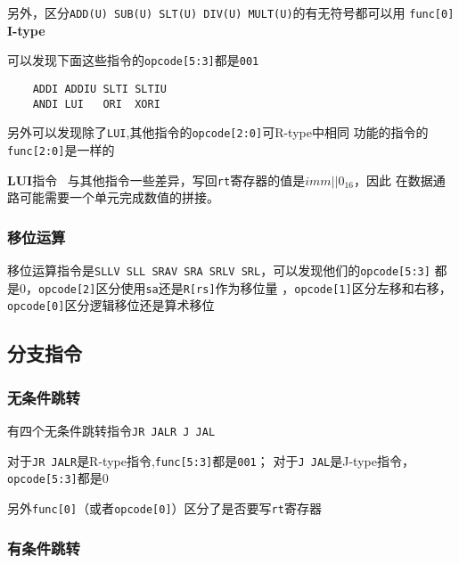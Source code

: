 \documentclass[UTF8]{ctexart}
\begin{document}
另外，区分\texttt{ADD(U) SUB(U) SLT(U) DIV(U) MULT(U)}的有无符号都可以用
\texttt{func[0]} \\

\textbf{I-type}

可以发现下面这些指令的\texttt{opcode[5:3]}都是\texttt{001}

\begin{verbatim}
    ADDI ADDIU SLTI SLTIU 
    ANDI LUI   ORI  XORI
\end{verbatim}

另外可以发现除了\texttt{LUI},其他指令的\texttt{opcode[2:0]}可R-type中相同
功能的指令的\texttt{func[2:0]}是一样的\\
\par\textbf{LUI}指令 \ 与其他指令一些差异，写回\texttt{rt}寄存器的值是$imm||0_{16}$，因此
在数据通路可能需要一个单元完成数值的拼接。

\subsubsection{移位运算}

移位运算指令是\texttt{SLLV SLL SRAV SRA SRLV SRL}，可以发现他们的\texttt{opcode[5:3]}
都是0，\texttt{opcode[2]}区分使用\texttt{sa}还是\texttt{R[rs]}作为移位量
，\texttt{opcode[1]}区分左移和右移，\texttt{opcode[0]}区分逻辑移位还是算术移位


\subsection{分支指令}

\subsubsection{无条件跳转}

有四个无条件跳转指令\texttt{JR JALR J JAL}

对于\texttt{JR JALR}是R-type指令,\texttt{func[5:3]}都是\texttt{001}；
对于\texttt{J JAL}是J-type指令，\texttt{opcode[5:3]}都是0

另外\texttt{func[0]}（或者\texttt{opcode[0]}）区分了是否要写\texttt{rt}寄存器


\subsubsection{有条件跳转}
\end{document}
